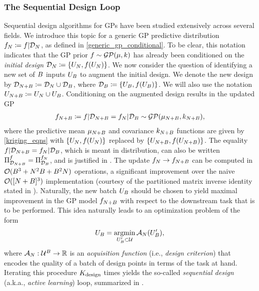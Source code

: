 \documentclass[12pt]{article}
\begin{document}
\subsubsection{The Sequential Design Loop}
Sequential design algorithms for GPs have been studied extensively across several fields. We introduce this topic 
for a generic GP predictive distribution $\funcEm[\Ndesign] \Def \func|\design[\Ndesign]$, as defined in 
\ref{generic_gp_conditional}. To be clear, this notation indicates that the GP prior 
$\func \sim \GP(\gpMeanPrior, \gpKerPrior)$ has already been conditioned on the \textit{initial design}
$\design[\Ndesign] \Def \{\designIn, \func(\designIn)\}$. We now consider the question of identifying a new set of $\Nbatch$
inputs $\designBatchIn$ to augment the initial design. We denote the new design by 
$\design[\Naugment] \Def \design[\Ndesign] \cup \design[\Nbatch]$, where 
$\design[\Nbatch] \Def \{\designBatchIn, \func(\designBatchIn)\}$. We will also use the notation 
 $\designIn[\Naugment] \Def \designIn \cup \designBatchIn$.
Conditioning on the augmented design results in the updated GP
\begin{align}
\funcEm[\Naugment] \Def \func|\design[\Naugment] = \funcEm[\Ndesign] | \design[\Nbatch] \sim \GP(\gpMean[\Naugment], \gpKer[\Naugment]),
\end{align}
where the predictive mean $\gpMean[\Naugment]$ and covariance $\gpKer[\Naugment]$ functions are given by \ref{kriging_eqns}
with $\{\designIn, \func(\designIn)\}$ replaced by $\{\designIn[\Naugment], \func(\designIn[\Naugment])\}$. The equality 
$\func|\design[\Naugment] = \funcEm[\Ndesign] | \design[\Nbatch]$, which is meant in distribution, can also be written 
$\emLaw[{\design[\Naugment]}]{\func} = \emLaw[{\design[\Nbatch]}]{\funcEm}$, and is justified in . 
The update $\funcEm[\Ndesign] \to \funcEm[\Naugment]$ 
can be computed in $\BigO(\Nbatch^3 + \Ndesign^2 \Nbatch + \Nbatch^2 \Ndesign)$ operations, 
a significant improvement over the naive $\BigO([\Ndesign + \Nbatch]^3)$
implementation (courtesy of the partitioned matrix inverse identity stated in ). 
Naturally, the new batch $\designBatchIn$ should be chosen to 
yield maximal improvement in the GP model $\funcEm[\Naugment]$ with respect to the downstream task that is to be performed. 
This idea naturally leads to an optimization problem of the form 
\begin{align}
\designBatchIn = \argmin_{\designBatchIn^\prime \subset \parSpace} \acq[\Ndesign](\designBatchIn^\prime), \label{acq_func_opt}
\end{align}
where $\acq[\Ndesign]: \parSpace^{\Nbatch} \to \R$ is an \textit{acquisition function} (i.e., \textit{design criterion}) that 
encodes the quality of a batch of design points in terms of the task at hand. Iterating this procedure $\Nrounds$ times yields the so-called 
\textit{sequential design} (a.k.a., \textit{active learning}) loop, summarized in .  
\end{document}
